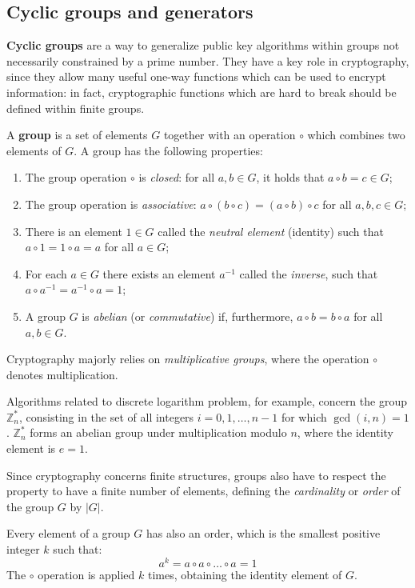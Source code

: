 \subsection{Cyclic groups and generators}
\textbf{Cyclic groups} are a way to generalize public key algorithms within groups not necessarily constrained by a prime number. They have a key role in cryptography, since they allow many useful one-way functions which can be used to encrypt information: in fact, cryptographic functions which are hard to break should be defined within finite groups.

A \textbf{group} is a set of elements $G$ together with an operation $\circ$ which combines two elements of $G$. A group has the following properties:
\begin{enumerate}
	\item The group operation $\circ$ is \textit{closed}: for all $a, b \in G$, it holds that $a \circ b = c \in G$;
	\item The group operation is \textit{associative}: $a \circ (b \circ c) = (a \circ b) \circ c$ for all $a, b, c \in G$;
	\item There is an element $1 \in G$ called the \textit{neutral element} (identity) such that $a \circ 1 = 1 \circ a = a$ for all $a \in G$;
	\item For each $a \in G$ there exists an element $a^{-1}$ called the \textit{inverse}, such that $a \circ a^{-1} = a^{-1} \circ a = 1$;
	\item A group $G$ is \textit{abelian} (or \textit{commutative}) if, furthermore, $a \circ b = b \circ a$ for all $a, b \in G$.
\end{enumerate}
Cryptography majorly relies on \textit{multiplicative groups}, where the operation $\circ$ denotes multiplication.

Algorithms related to discrete logarithm problem, for example, concern the group $\mathbb{Z}^*_n$, consisting in the set of all integers $i = 0, 1, \dots, n - 1$ for which $\gcd(i, n) = 1$. $\mathbb{Z}^*_n$ forms an abelian group under multiplication modulo $n$, where the identity element is $e = 1$.

Since cryptography concerns finite structures, groups also have to respect the property to have a finite number of elements, defining the \textit{cardinality} or \textit{order} of the group $G$ by $|G|$. 

Every element of a group $G$ has also an order, which is the smallest positive integer $k$ such that:
$$a^k = a \circ a \circ \dots \circ a = 1$$
The $\circ$ operation is applied $k$ times, obtaining the identity element of $G$.

